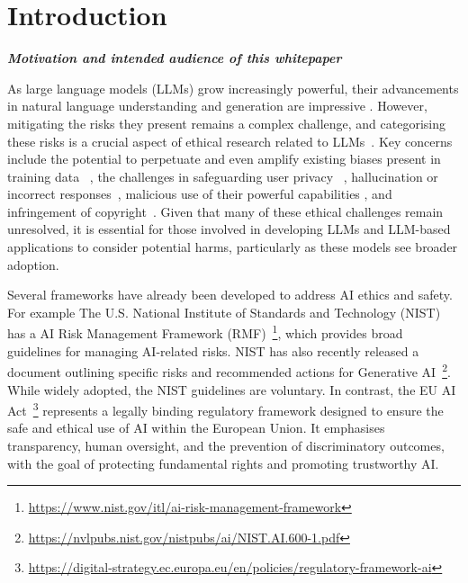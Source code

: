 \section{Introduction}
\noindent\textbf{\textit{Motivation and intended audience of this whitepaper}}
\newline


As large language models (LLMs) grow increasingly powerful, their advancements in natural language understanding and generation are impressive \citep{min_recent_2023}. However, mitigating the risks they present remains a complex challenge, and categorising these risks is a crucial aspect of ethical research related to LLMs~\cite{weidinger2022taxonomy}. Key concerns include the potential to perpetuate and even amplify existing biases present in training data ~\citep{gallegos2024bias}, the challenges in safeguarding user privacy ~\citep{yao2024survey}, hallucination or incorrect responses~\citep{abercrombie-etal-2023-mirages, xu2024hallucination}, malicious use of their powerful capabilities \citep{cuthbertson_chatgpt_2023}, and infringement of copyright~\citep{Lucchi_2023}. Given that many of these ethical challenges remain unresolved, it is essential for those involved in developing LLMs and LLM-based applications to consider potential harms, particularly as these models see broader adoption.

Several frameworks have already been developed to address AI ethics and safety. For example The U.S. National Institute of Standards and Technology (NIST) has a AI Risk Management Framework (RMF)~\footnote{\url{https://www.nist.gov/itl/ai-risk-management-framework}}, which provides broad guidelines for managing AI-related risks. NIST has also recently released a document outlining specific risks and recommended actions for Generative AI~\footnote{\url{https://nvlpubs.nist.gov/nistpubs/ai/NIST.AI.600-1.pdf}}. While widely adopted, the NIST guidelines are voluntary. In contrast, the EU AI Act~\footnote{\url{https://digital-strategy.ec.europa.eu/en/policies/regulatory-framework-ai}} represents a legally binding regulatory framework designed to ensure the safe and ethical use of AI within the European Union. It emphasises transparency, human oversight, and the prevention of discriminatory outcomes, with the goal of protecting fundamental rights and promoting trustworthy AI.  

